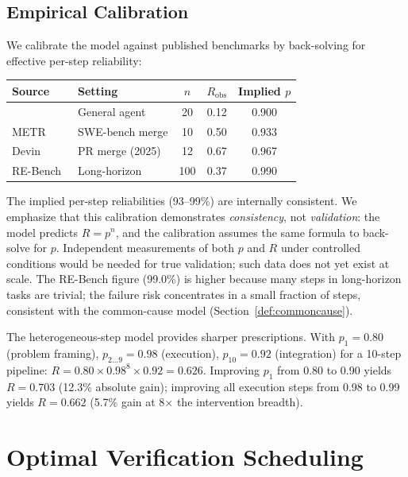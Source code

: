 \documentclass[11pt, a4paper, copyright]{googledeepmind}
\begin{document}
\subsection{Empirical Calibration}

We calibrate the model against published benchmarks by back-solving for effective per-step reliability:

\begin{center}
\begin{tabular}{llccc}
\toprule
Source & Setting & $n$ & $R_{\text{obs}}$ & Implied $p$ \\
\midrule
\citet{rajan2026math} & General agent & 20 & 0.12 & 0.900 \\
METR~\citep{metr2026swebench} & SWE-bench merge & 10 & 0.50 & 0.933 \\
Devin~\citep{cognition2025devin} & PR merge (2025) & 12 & 0.67 & 0.967 \\
RE-Bench~\citep{stanfordhai2025} & Long-horizon & 100 & 0.37 & 0.990 \\
\bottomrule
\end{tabular}
\end{center}

The implied per-step reliabilities (93--99\%) are internally consistent.
We emphasize that this calibration demonstrates \emph{consistency}, not \emph{validation}: the model predicts $R = p^n$, and the calibration assumes the same formula to back-solve for $p$.
Independent measurements of both $p$ and $R$ under controlled conditions would be needed for true validation; such data does not yet exist at scale.
The RE-Bench figure (99.0\%) is higher because many steps in long-horizon tasks are trivial; the failure risk concentrates in a small fraction of steps, consistent with the common-cause model (Section~\ref{def:commoncause}).

The heterogeneous-step model provides sharper prescriptions.
With $p_1 = 0.80$ (problem framing), $p_{2 \ldots 9} = 0.98$ (execution), $p_{10} = 0.92$ (integration) for a 10-step pipeline: $R = 0.80 \times 0.98^8 \times 0.92 = 0.626$.
Improving $p_1$ from 0.80 to 0.90 yields $R = 0.703$ (12.3\% absolute gain); improving all execution steps from 0.98 to 0.99 yields $R = 0.662$ (5.7\% gain at 8$\times$ the intervention breadth).

\section{Optimal Verification Scheduling}
\label{sec:verification}
\end{document}
